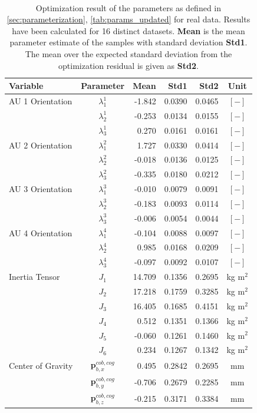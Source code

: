 ~\\

\begin{table}[H]
\captionsetup{width=0.9\textwidth}
\centering
\caption{Optimization result of the parameters as defined in \cref{sec:parameterization}, \cref{tab:params_updated} for real data. Results have been calculated for 16 distinct datasets. \textbf{Mean} is the mean parameter estimate of the samples with standard deviation \textbf{Std1}. The mean over the expected standard deviation from the optimization residual is given as \textbf{Std2}. }
\begin{tabular}{lcrrrc}
Variable & Parameter & Mean & Std1 & Std2 & Unit \\
\hline \hline
AU 1 Orientation & $\lambda_1^1$ & -1.842 & 0.0390 & 0.0465 & $[-]$ \\
                 & $\lambda_2^1$ & -0.253 & 0.0134 & 0.0155 & $[-]$ \\
                 & $\lambda_3^1$ &  0.270 & 0.0161 & 0.0161 & $[-]$ \\
AU 2 Orientation & $\lambda_1^2$ &  1.727 & 0.0330 & 0.0414 & $[-]$ \\
                 & $\lambda_2^2$ & -0.018 & 0.0136 & 0.0125 & $[-]$ \\
                 & $\lambda_3^2$ & -0.335 & 0.0180 & 0.0212 & $[-]$ \\
AU 3 Orientation & $\lambda_1^3$ & -0.010 & 0.0079 & 0.0091 & $[-]$ \\
                 & $\lambda_2^3$ & -0.183 & 0.0093 & 0.0114 & $[-]$ \\
                 & $\lambda_3^3$ & -0.006 & 0.0054 & 0.0044 & $[-]$ \\
AU 4 Orientation & $\lambda_1^4$ & -0.104 & 0.0088 & 0.0097 & $[-]$ \\
                 & $\lambda_2^4$ &  0.985 & 0.0168 & 0.0209 & $[-]$ \\
                 & $\lambda_3^4$ & -0.097 & 0.0092 & 0.0107 & $[-]$ \\
\hline
Inertia Tensor & $J_1$ & 14.709 & 0.1356 & 0.2695 & kg m$^2$ \\
               & $J_2$ & 17.218 & 0.1759 & 0.3285 & kg m$^2$ \\
               & $J_3$ & 16.405 & 0.1685 & 0.4151 & kg m$^2$ \\
               & $J_4$ &  0.512 & 0.1351 & 0.1366 & kg m$^2$ \\
               & $J_5$ & -0.060 & 0.1261 & 0.1460 & kg m$^2$ \\
               & $J_6$ &  0.234 & 0.1267 & 0.1342 & kg m$^2$ \\
\hline
Center of Gravity & $\mathbf{p}_{b,x}^{cob,cog}$ &  0.495 & 0.2842 & 0.2695 & mm \\
                  & $\mathbf{p}_{b,y}^{cob,cog}$ & -0.706 & 0.2679 & 0.2285 & mm \\
                  & $\mathbf{p}_{b,z}^{cob,cog}$ & -0.215 & 0.3171 & 0.3384 & mm \\
\hline
\end{tabular}
\end{table}
